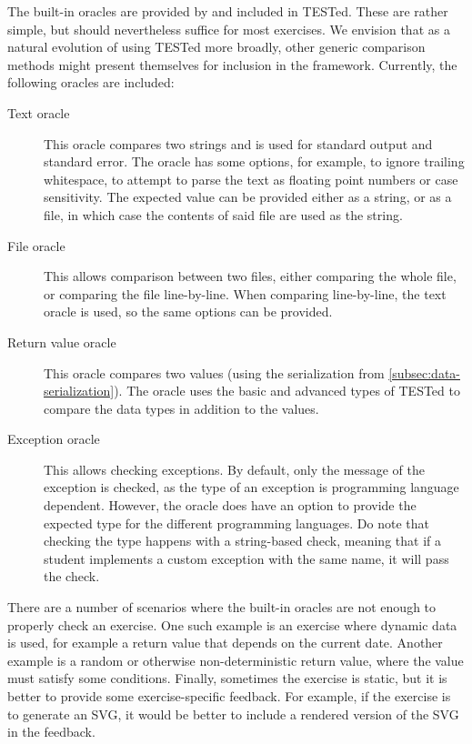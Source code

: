 \documentclass[../main]{subfiles}
\begin{document}
The built-in oracles are provided by and included in TESTed.
These are rather simple, but should nevertheless suffice for most exercises.
We envision that as a natural evolution of using TESTed more broadly, other generic comparison methods might present themselves for inclusion in the framework.
Currently, the following oracles are included:

\begin{description}
    \item[Text oracle] This oracle compares two strings and is used for standard output and standard error.
    The oracle has some options, for example, to ignore trailing whitespace, to attempt to parse the text as floating point numbers or case sensitivity.
    The expected value can be provided either as a string, or as a file, in which case the contents of said file are used as the string.
    \item[File oracle] This allows comparison between two files, either comparing the whole file, or comparing the file line-by-line.
    When comparing line-by-line, the text oracle is used, so the same options can be provided.
    \item[Return value oracle] This oracle compares two values (using the serialization from \cref{subsec:data-serialization}).
    The oracle uses the basic and advanced types of TESTed to compare the data types in addition to the values.
    \item[Exception oracle] This allows checking exceptions.
    By default, only the message of the exception is checked, as the type of an exception is programming language dependent.
    However, the oracle does have an option to provide the expected type for the different programming languages.
    Do note that checking the type happens with a string-based check, meaning that if a student implements a custom exception with the same name, it will pass the check.
\end{description}

There are a number of scenarios where the built-in oracles are not enough to properly check an exercise.
One such example is an exercise where dynamic data is used, for example a return value that depends on the current date.
Another example is a random or otherwise non-deterministic return value, where the value must satisfy some conditions.
Finally, sometimes the exercise is static, but it is better to provide some exercise-specific feedback.
For example, if the exercise is to generate an SVG, it would be better to include a rendered version of the SVG in the feedback.
\end{document}
